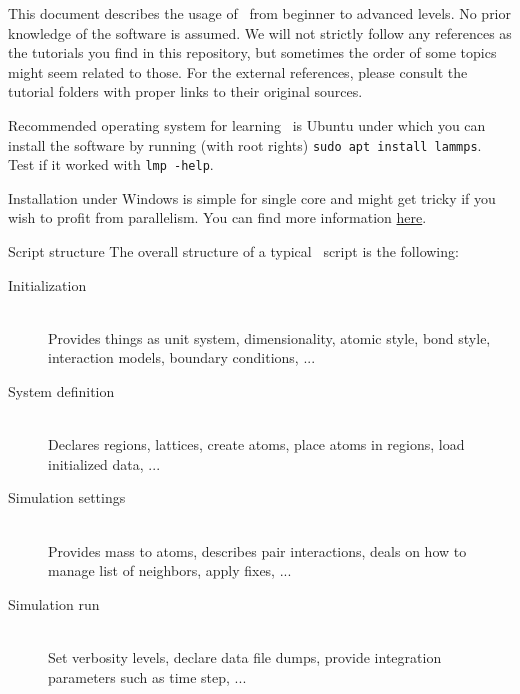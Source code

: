 \begin{frame}{\secname}
This document describes the usage of \LAMMPS\ from beginner to advanced levels. No prior knowledge of the software is assumed. We will not strictly follow any references as the tutorials you find in this repository, but sometimes the order of some topics might seem related to those. For the external references, please consult the tutorial folders with proper links to their original sources.

\vspace{1cm}

Recommended operating system for learning \LAMMPS\ is Ubuntu under which you can install the software by running (with root rights) \Verb|sudo apt install lammps|. Test if it worked with \Verb|lmp -help|.

\vspace{1cm}

Installation under Windows is simple for single core and might get tricky if you wish to profit from parallelism. You can find more information \href{https://packages.lammps.org/windows.html}{here}.
\end{frame}

\begin{frame}{\secname}{Script structure}
The overall structure of a typical \LAMMPS\ script is the following:

\vspace{0.5cm}

\begin{description}
\item[Initialization]\hfill\\
Provides things as unit system, dimensionality, atomic style, bond style, interaction models, boundary conditions, ...
%
\item[System definition]\hfill\\
Declares regions, lattices, create atoms, place atoms in regions, load initialized data, ...
%
\item[Simulation settings]\hfill\\
Provides mass to atoms, describes pair interactions, deals on how to manage list of neighbors, apply fixes, ...
%
\item[Simulation run]\hfill\\
Set verbosity levels, declare data file dumps, provide integration parameters such as time step, ...
\end{description}
\end{frame}

